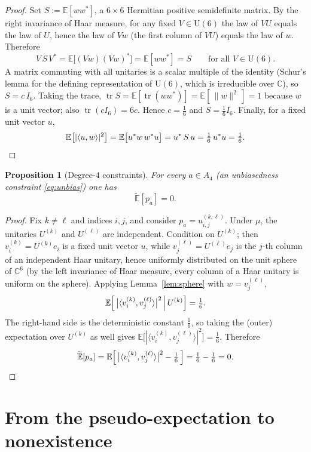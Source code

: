 \documentclass{amsart}
\newtheorem{proposition}{Proposition}
\theoremstyle{definition}
\theoremstyle{remark}
\begin{document}
\begin{proof}
Set $S:=\mathbb{E}[ww^{*}]$, a $6\times6$ Hermitian positive semidefinite matrix. By the right
invariance of Haar measure, for any fixed $V\in\mathrm{U}(6)$ the law of $VU$ equals the law of
$U$, hence the law of $Vw$ (the first column of $VU$) equals the law of $w$. Therefore
\[
V\,S\,V^{*}=\mathbb{E}\bigl[(Vw)(Vw)^{*}\bigr]=\mathbb{E}[ww^{*}]=S
\qquad\text{for all }V\in\mathrm{U}(6).
\]
A matrix commuting with all unitaries is a scalar multiple of the identity (Schur's lemma for
the defining representation of $\mathrm{U}(6)$, which is irreducible over $\mathbb{C}$), so
$S=c\,I_6$. Taking the trace, $\operatorname{tr}S=\mathbb{E}[\operatorname{tr}(ww^{*})]
=\mathbb{E}[\,\|w\|^2\,]=1$ because $w$ is a unit vector; also $\operatorname{tr}(cI_6)=6c$.
Hence $c=\tfrac16$ and $S=\tfrac16 I_6$. Finally, for a fixed unit vector $u$,
\[
\mathbb{E}\bigl[|\langle u,w\rangle|^2\bigr]
=\mathbb{E}\bigl[u^{*}w\,w^{*}u\bigr]
=u^{*}\,S\,u=\tfrac16\,u^{*}u=\tfrac16. \qedhere
\]
\end{proof}

\begin{proposition}[Degree-$4$ constraints]\label{prop:deg4}
For every $a\in A_4$ (an unbiasedness constraint \eqref{eq:unbias}) one has
\[
\widetilde{\mathbb{E}}[p_a]=0 .
\]
\end{proposition}

\begin{proof}
Fix $k\ne\ell$ and indices $i,j$, and consider $p_a=u^{(k,\ell)}_{i,j}$. Under $\mu$, the
unitaries $U^{(k)}$ and $U^{(\ell)}$ are independent. Condition on $U^{(k)}$; then
$v^{(k)}_i=U^{(k)}e_i$ is a fixed unit vector $u$, while $v^{(\ell)}_j=U^{(\ell)}e_j$ is the
$j$-th column of an independent Haar unitary, hence uniformly distributed on the unit sphere of
$\mathbb{C}^6$ (by the left invariance of Haar measure, every column of a Haar unitary is
uniform on the sphere). Applying Lemma~\ref{lem:sphere} with $w=v^{(\ell)}_j$,
\[
\mathbb{E}\Bigl[\,\bigl|\langle v^{(k)}_i,v^{(\ell)}_j\rangle\bigr|^2 \,\Big|\, U^{(k)}\Bigr]
=\tfrac16 .
\]
The right-hand side is the deterministic constant $\tfrac16$, so taking the (outer)
expectation over $U^{(k)}$ as well gives
$\mathbb{E}\bigl[|\langle v^{(k)}_i,v^{(\ell)}_j\rangle|^2\bigr]=\tfrac16$. Therefore
\[
\widetilde{\mathbb{E}}[p_a]
=\mathbb{E}\Bigl[\,\bigl|\langle v^{(k)}_i,v^{(\ell)}_j\rangle\bigr|^2-\tfrac16\,\Bigr]
=\tfrac16-\tfrac16=0 . \qedhere
\]
\end{proof}

\section{From the pseudo-expectation to nonexistence}\label{sec:duality}
\end{document}
